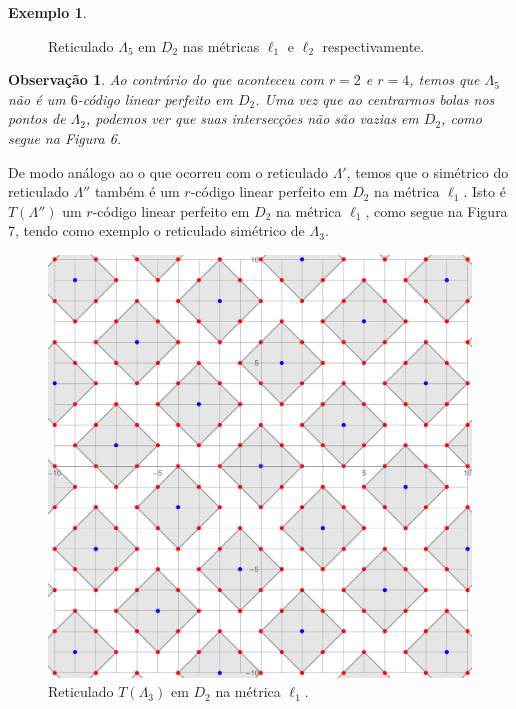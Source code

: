 \documentclass{article}
\theoremstyle{plain}
\newtheorem{observation}{Observa\c{c}\~ao}
\theoremstyle{definition}
\newtheorem{example}{Exemplo}
\theoremstyle{remark}
\begin{document}
\begin{example}
\begin{figure}[ht]
          \caption{Reticulado $\Lambda_5$ em $D_2$ nas métricas $\ell_1$ e $\ell_2$ respectivamente.}
		\end{figure}
  \end{example}

  \begin{observation}
    Ao contrário do que aconteceu com $r=2$ e $r=4$, temos que $\Lambda_5$ não é um $6$-código linear perfeito em $D_2$. Uma vez que ao centrarmos bolas nos pontos de $\Lambda_2$, podemos ver que suas intersecções não são vazias em $D_2$, como segue na Figura 6. 
    \vspace{0.5cm}
  \end{observation}

  De modo análogo ao o que ocorreu com o reticulado $\Lambda'$, temos que o simétrico do reticulado $\Lambda''$ também é um $r$-código linear perfeito em $D_2$ na métrica $\ell_1$. Isto é $T(\Lambda'')$  um $r$-código linear perfeito em $D_2$ na métrica $\ell_1$, como segue na Figura 7, tendo como exemplo o reticulado simétrico de $\Lambda_3$. 

  \begin{figure}[ht]
    \centering
        \includegraphics[scale=0.23]{simr2l2.pdf}
        \caption{Reticulado $T(\Lambda_3)$ em $D_2$ na métrica $\ell_1$.}
  \end{figure}
\end{document}
